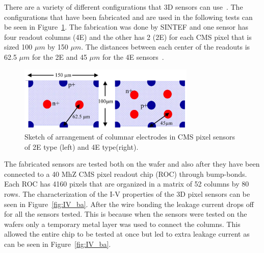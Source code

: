 There are a variety of different configurations that 3D sensors can use~\cite{3dsilicon}.  The configurations that have been fabricated and are used in the following tests can be seen in Figure~\ref{fig:configuration_3d}. The fabrication was done by SINTEF and one sensor has four readout columns (4E) and the other has 2 (2E) for each CMS pixel that is sized 100 $\mu m$ by 150 $\mu m$.  The distances between each center of the readouts is 62.5 $\mu m$ for the 2E and 45 $\mu m$ for the 4E sensors~\cite{5556029}.


\begin{figure}[htb!]
\begin{center}
\centerline{
\includegraphics[width=0.75\textwidth]{3D/configuration.pdf}
}
\caption{Sketch of arrangement of columnar electrodes in CMS pixel sensors of
2E type (left) and 4E type(right).~\cite{5734879} }
\label{fig:configuration_3d}
\end{center}
\end{figure}

The fabricated sensors are tested both on the wafer and also after they have been connected to a 40 MhZ CMS pixel readout chip (ROC) through bump-bonds.  Each ROC has 4160 pixels that are organized in a matrix of 52 columns by 80 rows. The characterization of the I-V properties of the 3D pixel sensors can be seen in Figure~\ref{fig:IV_ba}. After the wire bonding the leakage current drops off for all the sensors tested.  This is because when the sensors were tested on the wafers only a temporary metal layer was used to connect the columns.  This allowed the entire chip to be tested at once but led to extra leakage current as can be seen in Figure~\ref{fig:IV_ba}.

